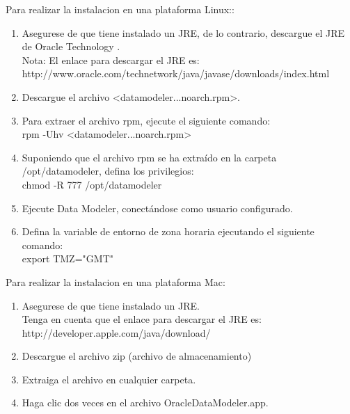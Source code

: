 \documentclass[12pt,letterpaper]{article}
\begin{document}
	
Para realizar la instalacion en una plataforma Linux::
\begin{enumerate}[1.]
    \item Asegurese de que tiene instalado un JRE, de lo contrario, descargue el JRE de Oracle Technology .  \\
    Nota: El enlace para descargar el JRE es: http://www.oracle.com/technetwork/java/javase/downloads/index.html
    
   \item Descargue el archivo <datamodeler...noarch.rpm>.
   
   \item Para extraer el archivo rpm, ejecute el siguiente comando:\\
   rpm -Uhv <datamodeler...noarch.rpm>
   
   \item Suponiendo que el archivo rpm se ha extraído en la carpeta /opt/datamodeler, defina los privilegios:\\
   chmod -R 777 /opt/datamodeler
   
    \item Ejecute Data Modeler, conectándose como usuario configurado.
    
    \item Defina la variable de entorno de zona horaria ejecutando el siguiente comando:\\
    export TMZ="GMT"
   
		\end{enumerate}
		
		
		
		Para realizar la instalacion en una plataforma Mac:
\begin{enumerate}[1.]
    \item Asegurese de que tiene instalado un JRE.  \\
    Tenga en cuenta que el enlace para descargar el JRE es: http://developer.apple.com/java/download/
    
   \item Descargue el archivo zip (archivo de almacenamiento)
   
   \item Extraiga el archivo en cualquier carpeta.
   
   \item Haga clic dos veces en el archivo OracleDataModeler.app.

		\end{enumerate}
\end{document}
